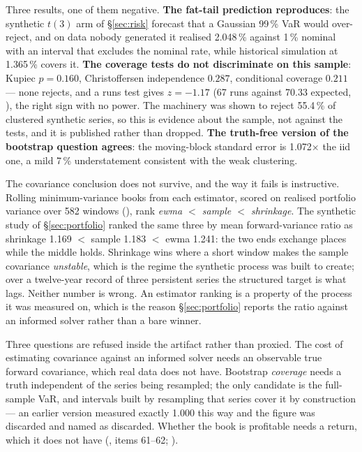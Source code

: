 \documentclass[11pt,a4paper]{article}
\begin{document}
Three results, one of them negative. \textbf{The fat-tail prediction reproduces}: the synthetic
$t(3)$ arm of \S\ref{sec:risk} forecast that a Gaussian 99\,\% VaR would over-reject, and
on data nobody generated it realised 2.048\,\% against 1\,\% nominal with an interval that excludes
the nominal rate, while historical simulation at 1.365\,\% covers it. \textbf{The coverage tests do
not discriminate on this sample}: Kupiec $p = 0.160$, Christoffersen independence $0.287$,
conditional coverage $0.211$ --- none rejects, and a runs test gives $z = -1.17$ (67 runs against
70.33 expected, ), the
right sign with no power. The machinery was shown to reject 55.4\,\% of
clustered synthetic series, so this is evidence about the sample, not against the tests, and it is
published rather than dropped. \textbf{The truth-free version of the bootstrap question agrees}:
the moving-block standard error is 1.072$\times$ the iid one, a mild 7\,\% understatement
consistent with the weak clustering.

The covariance conclusion does not survive, and the way it fails is instructive. Rolling
minimum-variance books from each estimator, scored on realised portfolio variance over 582
windows (), rank
\emph{ewma $<$ sample $<$ shrinkage}. The synthetic study of
\S\ref{sec:portfolio} ranked the same three by mean forward-variance ratio as shrinkage 1.169
$<$ sample 1.183 $<$ ewma 1.241: the two ends exchange places while the middle holds. Shrinkage
wins where a short window makes the sample covariance \emph{unstable}, which is the regime the
synthetic process was built to create; over a twelve-year record of three persistent series the
structured target is what lags. Neither number is wrong. An estimator ranking is a property of the
process it was measured on, which is the reason \S\ref{sec:portfolio} reports the ratio against an
informed solver rather than a bare winner.

Three questions are refused inside the artifact rather than proxied. The cost of estimating
covariance against an informed solver needs an observable true forward covariance, which real data
does not have. Bootstrap \emph{coverage} needs a truth independent of the series being resampled;
the only candidate is the full-sample VaR, and intervals built by resampling that series cover it
by construction --- an earlier version measured exactly 1.000 this way and the figure was discarded
and named as discarded. Whether the book is profitable needs a return, which it does not have
(, items 61--62; ).
\end{document}
